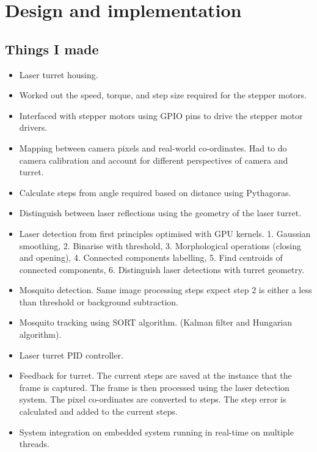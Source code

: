 
\section{Design and implementation}

\subsection{Things I made}
\begin{itemize}
    \item Laser turret housing.
    \item Worked out the speed, torque, and step size required for the stepper motors.
    \item Interfaced with stepper motors using GPIO pins to drive the stepper motor drivers.
    \item Mapping between camera pixels and real-world co-ordinates. Had to do camera calibration and account for different perspectives of camera and turret.
    \item Calculate steps from angle required based on distance using Pythagoras.
    \item Distinguish between laser reflections using the geometry of the laser turret.
    \item Laser detection from first principles optimised with GPU kernels. 1. Gaussian smoothing, 2. Binarise with threshold, 3. Morphological operations (closing and opening), 4. Connected components labelling, 5. Find centroids of connected components, 6. Distinguish laser detections with turret geometry.
    \item Mosquito detection. Same image processing steps expect step 2 is either a less than threshold or background subtraction.
    \item Mosquito tracking using SORT algorithm. (Kalman filter and Hungarian algorithm).
    \item Laser turret PID controller.
    \item Feedback for turret. The current steps are saved at the instance that the frame is captured. The frame is then processed using the laser detection system. The pixel co-ordinates are converted to steps. The step error is calculated and added to the current steps.
    \item System integration on embedded system running in real-time on multiple threads.
\end{itemize}


